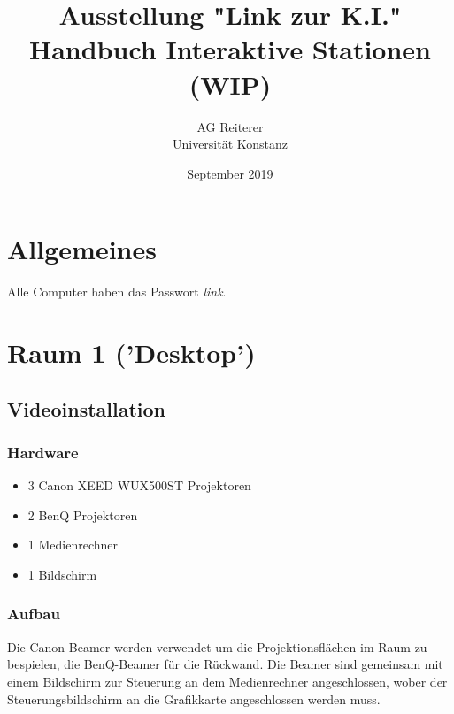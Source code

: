 \documentclass[titlepage,a4paper]{article}
\title{Ausstellung "Link zur K.I."\\
Handbuch Interaktive Stationen\\
(WIP)}
\author{
    AG Reiterer\\
    Universität Konstanz
}
\date{September 2019}
\begin{document}
\begin{titlepage}
\maketitle
\end{titlepage}



\tableofcontents

\pagebreak

\listoffigures 

\pagebreak


\section{Allgemeines}

Alle Computer haben das Passwort \textit{link}.

\section{Raum 1 ('Desktop')}

\subsection{Videoinstallation}

\subsubsection{Hardware}

\begin{itemize}
\item 3 Canon XEED WUX500ST Projektoren
\item 2 BenQ Projektoren
\item 1 Medienrechner
\item 1 Bildschirm
\end{itemize}

\subsubsection{Aufbau}

Die Canon-Beamer werden verwendet um die Projektionsflächen im Raum zu bespielen, die BenQ-Beamer für die Rückwand. Die Beamer sind gemeinsam mit einem Bildschirm zur Steuerung an dem Medienrechner angeschlossen, wober der Steuerungsbildschirm an die Grafikkarte angeschlossen werden muss.
\end{document}
